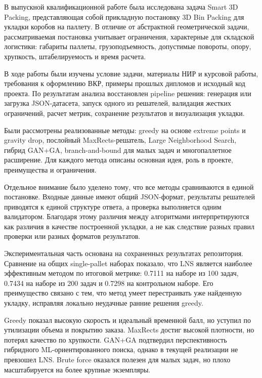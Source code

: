
В выпускной квалификационной работе была исследована задача Smart 3D Packing, представляющая собой прикладную постановку 3D Bin Packing для укладки коробов на паллету. В отличие от абстрактной геометрической задачи, рассматриваемая постановка учитывает ограничения, характерные для складской логистики: габариты паллеты, грузоподъемность, допустимые повороты, опору, хрупкость, штабелируемость и время расчета.

В ходе работы были изучены условие задачи, материалы НИР и курсовой работы, требования к оформлению ВКР, примеры прошлых дипломов и исходный код проекта. По результатам анализа восстановлен pipeline решения: генерация или загрузка JSON-датасета, запуск одного из решателей, валидация жестких ограничений, расчет метрик, сохранение результатов и визуализация укладки.

Были рассмотрены реализованные методы: greedy на основе extreme points и gravity drop, послойный MaxRects-решатель, Large Neighborhood Search, гибрид GAN+GA, branch-and-bound для малых задач и многопаллетное расширение. Для каждого метода описаны основная идея, роль в проекте, преимущества и ограничения.

Отдельное внимание было уделено тому, что все методы сравниваются в единой постановке. Входные данные имеют общий JSON-формат, результаты решателей приводятся к единой структуре ответа, а проверка выполняется одним валидатором. Благодаря этому различия между алгоритмами интерпретируются как различия в качестве построенной укладки, а не как следствие разных правил проверки или разных форматов результатов.

Экспериментальная часть основана на сохраненных результатах репозитория. Сравнение на общих single-pallet наборах показало, что LNS является наиболее эффективным методом по итоговой метрике: 0.7111 на наборе из 100 задач, 0.7434 на наборе из 200 задач и 0.7298 на контрольном наборе. Его преимущество связано с тем, что метод умеет перестраивать уже найденную укладку, исправляя локально неудачные ранние решения greedy.

Greedy показал высокую скорость и идеальный временной балл, но уступил по утилизации объема и покрытию заказа. MaxRects достиг высокой плотности, но потерял качество по хрупкости. GAN+GA подтвердил перспективность гибридного ML-ориентированного поиска, однако в текущей реализации не превзошел LNS. Brute force оказался полезен для малых задач, но плохо масштабируется на более крупные экземпляры.

